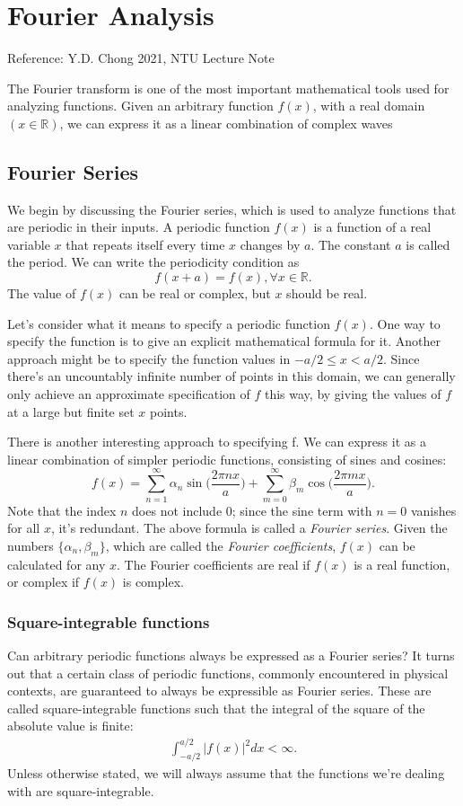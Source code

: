 \chapter{Fourier Analysis}
Reference: Y.D. Chong 2021, NTU Lecture Note

The Fourier transform is one of the most important mathematical tools used for analyzing functions. Given an arbitrary function $f(x)$, with a real domain $(x \in \mathbb{R})$, we can express it as a linear combination of complex waves

\section{Fourier Series}
\label{sec:fourier_series}

We begin by discussing the Fourier series, which is used to analyze functions that are periodic in their inputs. A periodic function $f(x)$ is a function of a real variable $x$ that repeats itself every time $x$ changes by $a$. The constant $a$ is called the period. We can write the periodicity condition as
$$f(x+a) = f(x), \forall x\in \mathbb{R}.$$
The value of $f(x)$ can be real or complex, but $x$ should be real.

Let's consider what it means to specify a periodic function $f(x)$. One way to specify the function is to give an explicit mathematical formula for it. Another approach might be to specify the function values in $−a/2 \leq x < a/2$. Since there's an uncountably infinite number of points in this domain, we can generally only achieve an approximate specification of $f$ this way, by giving the values of $f$ at a large but finite set $x$ points. 

There is another interesting approach to specifying f. We can express it as a linear combination of simpler periodic functions, consisting of sines and cosines:
$$f(x) = \sum_{n=1}^{\infty} \alpha_n \sin\bigg(\frac{2\pi n x}{a}\bigg)+\sum_{m=0}^{\infty}\beta_m \cos\bigg(\frac{2\pi m x}{a}\bigg).$$
Note that the index $n$ does not include 0; since the sine term with $n = 0$ vanishes for all $x$, it's redundant. The above formula is called a \textit{Fourier series}. Given the numbers $\{\alpha_n, \beta_m\}$, which are called the \textit{Fourier coefficients}, $f(x)$ can be calculated for any $x$. The Fourier coefficients are real if $f(x)$ is a real function, or complex if $f(x)$ is complex.

\subsection{Square-integrable functions}
Can arbitrary periodic functions always be expressed as a Fourier series? It turns out that a certain class of periodic functions, commonly encountered in physical contexts, are guaranteed to always be expressible as Fourier series. These are called square-integrable functions such that the integral of the square of the absolute value is finite:
\begin{align*}
\int_{-a/2}^{a/2}|f(x)|^2 dx < \infty.
\end{align*}
Unless otherwise stated, we will always assume that the functions we're dealing with are square-integrable.

